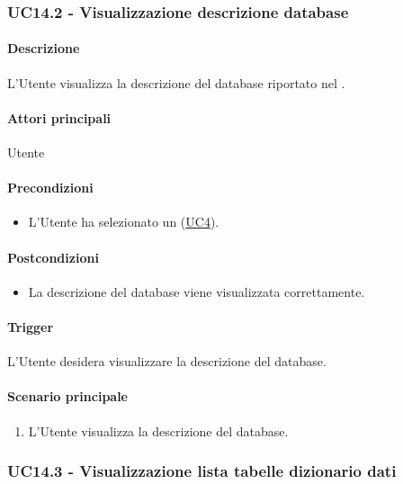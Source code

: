 \subsubsection{UC14.2 - Visualizzazione descrizione database}\label{UC14point2}
\paragraph*{Descrizione}
L'Utente visualizza la descrizione del database riportato nel .

\paragraph*{Attori principali}
Utente

\paragraph*{Precondizioni}
\begin{itemize}
  \item L'Utente ha selezionato un  (\hyperref[UC4]{UC4}).
\end{itemize}

\paragraph*{Postcondizioni}
\begin{itemize}
  \item La descrizione del database viene visualizzata correttamente.
\end{itemize}

\paragraph*{Trigger}
L'Utente desidera visualizzare la descrizione del database.

\paragraph*{Scenario principale}
\begin{enumerate}
  \item L'Utente visualizza la descrizione del database.
\end{enumerate}


\subsubsection{UC14.3 - Visualizzazione lista tabelle dizionario dati}\label{UC14point3}
